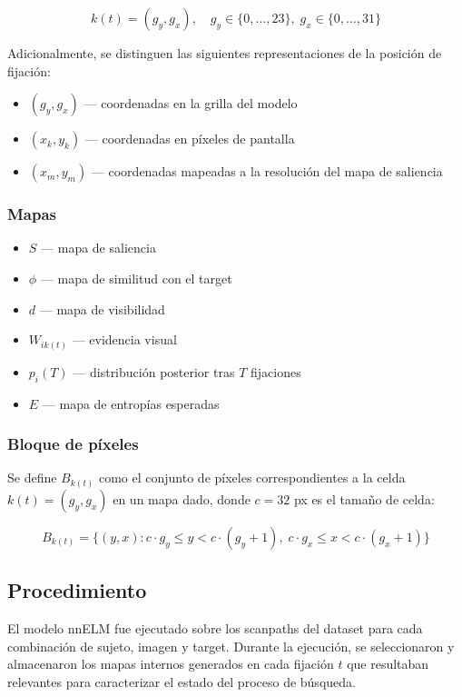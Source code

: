 \begin{equation}
    k(t) = (g_y, g_x), \quad g_y \in \{0, \ldots, 23\},\;
    g_x \in \{0, \ldots, 31\}
\end{equation}

Adicionalmente, se distinguen las siguientes representaciones de
la posición de fijación:
\begin{itemize}
    \item $(g_y, g_x)$ — coordenadas en la grilla del modelo
    \item $(x_k, y_k)$ — coordenadas en píxeles de pantalla
    \item $(x_m, y_m)$ — coordenadas mapeadas a la resolución
    del mapa de saliencia
\end{itemize}

\subsubsection*{Mapas}
\begin{itemize}
    \item $S$ — mapa de saliencia
    \item $\phi$ — mapa de similitud con el target
    \item $d$ — mapa de visibilidad
    \item $W_{ik(t)}$ — evidencia visual
    \item $p_i(T)$ — distribución posterior tras $T$ fijaciones
    \item $E$ — mapa de entropías esperadas
\end{itemize}

\subsubsection*{Bloque de píxeles}

Se define $B_{k(t)}$ como el conjunto de píxeles correspondientes
a la celda $k(t) = (g_y, g_x)$ en un mapa dado, donde $c = 32$ px
es el tamaño de celda:

\begin{equation}
    B_{k(t)} = \{(y, x) : c \cdot g_y \leq y < c \cdot (g_y + 1),\;
    c \cdot g_x \leq x < c \cdot (g_x + 1)\}
\end{equation}

\subsection{Procedimiento}

El modelo nnELM fue ejecutado sobre los scanpaths del dataset para
cada combinación de sujeto, imagen y target. Durante la ejecución,
se seleccionaron y almacenaron los mapas internos generados en cada
fijación $t$ que resultaban relevantes para caracterizar el estado
del proceso de búsqueda.

